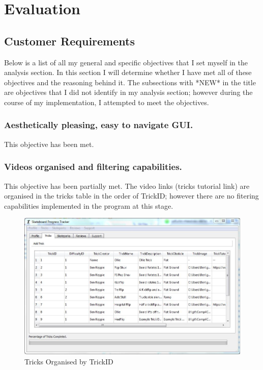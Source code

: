\chapter{Evaluation}

\section{Customer Requirements}

Below is a list of all my general and specific objectives that I set myself in the analysis section. In this section I will determine whether I have met all of these objectives and the reasoning behind it. The subsections with *NEW* in the title are objectives that I did not identify in my analysis section; however during the course of my implementation, I attempted to meet the objectives. 

\subsection{Aesthetically pleasing, easy to navigate GUI.} %

This objective has been met.




\subsection{Videos organised and filtering capabilities.}

This objective has been partially met. The video links (tricks tutorial link) are organised in the tricks table in the order of TrickID; however there are no fitering capabilities implemented in the program at this stage. 


\begin{figure}[H]
    \includegraphics[width=\textwidth]{./Evaluation/images/OrganisedTricks.jpg}
    \caption{Tricks Organised by TrickID} \label{fig:TricksOrganised}
\end{figure}

